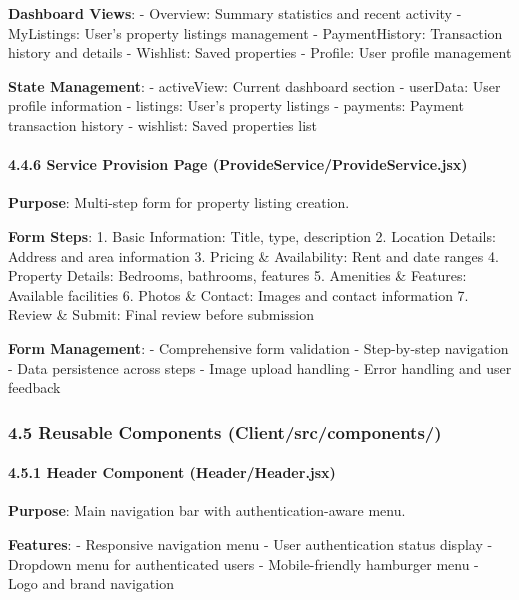 \documentclass[12pt,a4paper]{article}
\begin{document}
\textbf{Dashboard Views}: - Overview: Summary statistics and recent
activity - MyListings: User's property listings management -
PaymentHistory: Transaction history and details - Wishlist: Saved
properties - Profile: User profile management

\textbf{State Management}: - activeView: Current dashboard section -
userData: User profile information - listings: User's property listings
- payments: Payment transaction history - wishlist: Saved properties
list

\hypertarget{service-provision-page-provideserviceprovideservice.jsx}{%
\paragraph{4.4.6 Service Provision Page
(ProvideService/ProvideService.jsx)}\label{service-provision-page-provideserviceprovideservice.jsx}}

\textbf{Purpose}: Multi-step form for property listing creation.

\textbf{Form Steps}: 1. Basic Information: Title, type, description 2.
Location Details: Address and area information 3. Pricing \&
Availability: Rent and date ranges 4. Property Details: Bedrooms,
bathrooms, features 5. Amenities \& Features: Available facilities 6.
Photos \& Contact: Images and contact information 7. Review \& Submit:
Final review before submission

\textbf{Form Management}: - Comprehensive form validation - Step-by-step
navigation - Data persistence across steps - Image upload handling -
Error handling and user feedback

\hypertarget{reusable-components-clientsrccomponents}{%
\subsubsection{4.5 Reusable Components
(Client/src/components/)}\label{reusable-components-clientsrccomponents}}

\hypertarget{header-component-headerheader.jsx}{%
\paragraph{4.5.1 Header Component
(Header/Header.jsx)}\label{header-component-headerheader.jsx}}

\textbf{Purpose}: Main navigation bar with authentication-aware menu.

\textbf{Features}: - Responsive navigation menu - User authentication
status display - Dropdown menu for authenticated users - Mobile-friendly
hamburger menu - Logo and brand navigation
\end{document}
